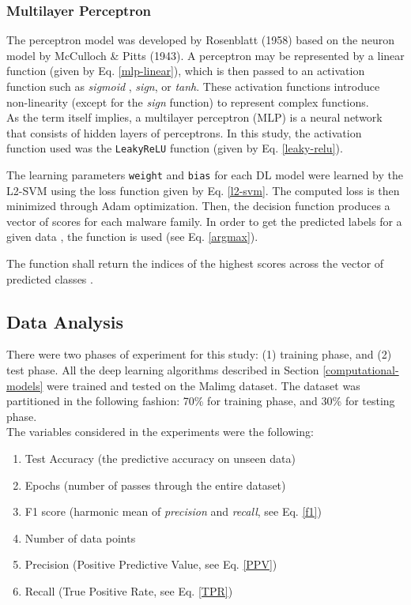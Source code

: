 \documentclass[sigconf]{acmart}
\begin{document}
\subsubsection{Multilayer Perceptron}\label{mlp}
The perceptron model was developed by Rosenblatt (1958)\cite{rosenblatt1958perceptron} based on the neuron model by McCulloch \& Pitts (1943)\cite{mcculloch1943logical}. A perceptron may be represented by a linear function (given by Eq. \ref{mlp-linear}), which is then passed to an activation function such as \textit{sigmoid} , \textit{sign}, or \textit{tanh}. These activation functions introduce non-linearity (except for the \textit{sign} function) to represent complex functions.\\
\indent	As the term itself implies, a multilayer perceptron (MLP) is a neural network that consists of hidden layers of perceptrons. In this study, the activation function used was the \texttt{LeakyReLU}\cite{maas2013rectifier} function (given by Eq. \ref{leaky-relu}).



\indent The learning parameters \texttt{weight} and \texttt{bias} for each DL model were learned by the L2-SVM using the loss function given by Eq. \ref{l2-svm}. The computed loss is then minimized through Adam\cite{Kingma} optimization. Then, the decision function  produces a vector of scores for each malware family. In order to get the predicted labels  for a given data , the  function is used (see Eq. \ref{argmax}).


\indent	The  function shall return the indices of the highest scores across the vector of predicted classes .

\subsection{Data Analysis}
There were two phases of experiment for this study: (1) training phase, and (2) test phase. All the deep learning algorithms described in Section \ref{computational-models} were trained and tested on the Malimg dataset\cite{nataraj2011malware}. The dataset was partitioned in the following fashion: 70\% for training phase, and 30\% for testing phase.\\
\indent	The variables considered in the experiments were the following: 
\begin{enumerate}
	\item Test Accuracy (the predictive accuracy on unseen data)
	\item Epochs (number of passes through the entire dataset)
	\item F1 score (harmonic mean of \textit{precision} and \textit{recall}, see Eq. \ref{f1})
	\item Number of data points
	\item Precision (Positive Predictive Value, see Eq. \ref{PPV}) 
	\item Recall (True Positive Rate, see Eq. \ref{TPR})
\end{enumerate}
\end{document}
